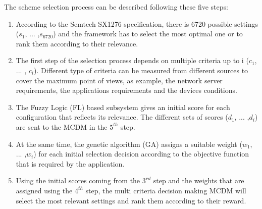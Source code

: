 The scheme selection process can be described following these five steps:

\begin{enumerate}
	\item According to the Semtech SX1276 specification\cite{lorasemtech}, there is 6720 possible settings ($s_{1}$, ... ,$s_{6720}$) and the framework has to select the most optimal one or to rank them according to their relevance.
	\item The first step of the selection process depends on multiple criteria up to i ($c_{1}$, ... , $c_{i}$).
		Different type of criteria can be measured from different sources to cover the maximum point of views,
		as example,
		the network server requirements, the applications requirements and the devices conditions.
	\item The Fuzzy Logic (FL) based subsystem gives an initial score for each configuration that reflects its relevance.
		The different sets of scores ($d_{1}$, ... ,$d_{i}$) are sent to the \ac{MCDM} in the $5^{th}$ step.
	\item At the same time,
			the genetic algorithm (GA) \cite{alkhawlani_access_2008} assigns a suitable weight ($w_{1}$, ... ,$w_{i}$) for each initial selection decision according to the objective function that is required by the application.
	\item Using the initial scores coming from the $3^{rd}$ step and the weights that are assigned using the $4^{th}$ step,
			the multi criteria decision making{} \ac{MCDM} will select the most relevant settings and rank them according to their reward.
\end{enumerate}


